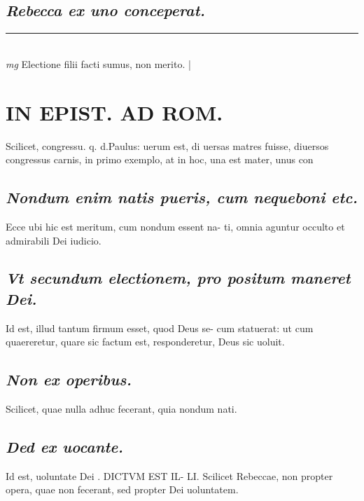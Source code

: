 \documentclass{article}
\begin{document}
\begin{pages}
\subsection*{\textit{Rebecca ex uno conceperat. }}\pstart  \pend\pstart  \pend
\vspace{0.5cm}\noindent
\vspace{0.2cm}\rule{1cm}{0.2pt}\\ 
\hspace{0.2cm}\textit{mg}
\footnotesize Electione filii facti sumus, non merito.  
\normalsize| 
\section*{IN EPIST. AD ROM.  }
\marginpar{[ p.m ]}\pstart Scilicet, congressu. q. d.Paulus: uerum est, di uersas matres fuisse, diuersos congressus carnis, in primo exemplo, at in hoc, una est mater, unus con  \pend
{}
{}
\subsection*{\textit{Nondum enim natis pueris, cum nequeboni etc. }}\pstart Ecce ubi hic est meritum, cum nondum essent na- ti, omnia aguntur occulto et admirabili Dei iudicio.  \pend
{}
{}
\subsection*{\textit{Vt secundum electionem, pro positum maneret Dei. }}\pstart Id est, illud tantum firmum esset, quod Deus se- cum statuerat: ut cum quaereretur, quare sic factum est, responderetur, Deus sic uoluit.   \pend
{}
{}
\subsection*{\textit{Non ex operibus. }}\pstart Scilicet, quae nulla adhuc fecerant, quia nondum nati.   \pend
{}
{}
\subsection*{\textit{Ded ex uocante. }}\pstart Id est, uoluntate Dei . DICTVM EST IL- LI. Scilicet Rebeccae, non propter opera, quae non fecerant, sed propter Dei uoluntatem.   \pend
{}
{}

\end{pages}
\end{document}
